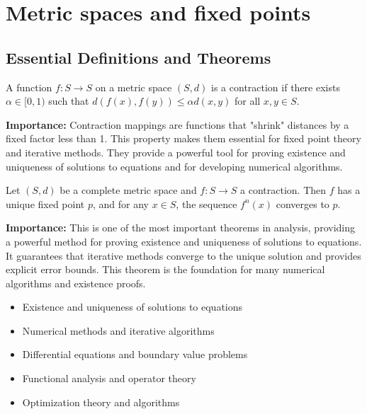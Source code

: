 \section{Metric spaces and fixed points}

\subsection*{Essential Definitions and Theorems}

\begin{definition}
A function $f: S \to S$ on a metric space $(S,d)$ is a contraction if there exists $\alpha \in [0,1)$ such that $d(f(x), f(y)) \leq \alpha d(x,y)$ for all $x,y \in S$.
\end{definition}

\noindent\textbf{Importance:} Contraction mappings are functions that "shrink" distances by a fixed factor less than 1. This property makes them essential for fixed point theory and iterative methods. They provide a powerful tool for proving existence and uniqueness of solutions to equations and for developing numerical algorithms.



\begin{theorem}
Let $(S,d)$ be a complete metric space and $f: S \to S$ a contraction. Then $f$ has a unique fixed point $p$, and for any $x \in S$, the sequence $f^n(x)$ converges to $p$.
\end{theorem}

\noindent\textbf{Importance:} This is one of the most important theorems in analysis, providing a powerful method for proving existence and uniqueness of solutions to equations. It guarantees that iterative methods converge to the unique solution and provides explicit error bounds. This theorem is the foundation for many numerical algorithms and existence proofs.


\begin{itemize}
\item Existence and uniqueness of solutions to equations
\item Numerical methods and iterative algorithms
\item Differential equations and boundary value problems
\item Functional analysis and operator theory
\item Optimization theory and algorithms
\end{itemize}

